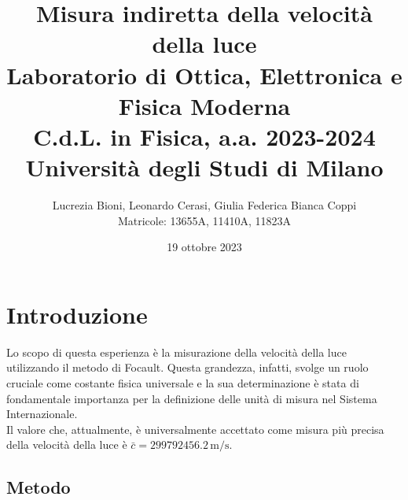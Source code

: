 \documentclass[]{article}
\title{%
    \Huge Misura indiretta della velocità della luce \\
    \Large Laboratorio di Ottica, Elettronica e Fisica Moderna \\ C.d.L. in Fisica, a.a. 2023-2024 \\ Università degli Studi di Milano}
\author{\LARGE Lucrezia Bioni, Leonardo Cerasi, Giulia Federica Bianca Coppi \\ Matricole: 13655A, 11410A, 11823A}
\date{19 ottobre 2023}
\let\oldsection\section%
\renewcommand{\section}{%
	\renewcommand{\theequation}{\thesection.\arabic{equation}}%
	\oldsection}%
\let\oldsubsection\subsection%
\renewcommand{\subsection}{%
	\renewcommand{\theequation}{\thesubsection.\arabic{equation}}%
	\oldsubsection}%
\begin{document}
    \maketitle

    \section{Introduzione}

    Lo scopo di questa esperienza è la misurazione della velocità della luce utilizzando 
    il metodo di Focault. Questa grandezza, infatti, svolge un ruolo cruciale come costante 
    fisica universale e la sua determinazione è stata di fondamentale importanza per la definizione 
    delle unità di misura nel Sistema Internazionale. \\
    Il valore che, attualmente, è universalmente accettato come misura più precisa della velocità della luce è $\bar{c} = 299792456.2 \,\text{m/s}$.

    \subsection{Metodo}
    
\end{document}
